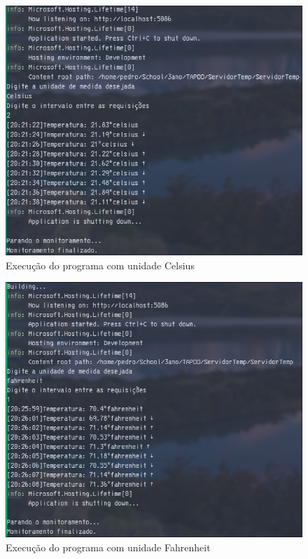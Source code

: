 \documentclass[
	12pt,				%
	oneside,			%
	a4paper,			%
	english,			%
	brazil,				%
	]{abntex2}
\begin{document}
{\begin{figure}[H]
    \centering
    \includegraphics[width=1\textwidth]{imgs/img1.png}
    \caption{Execução do programa com unidade Celsius}
    \label{fig:img1}
\end{figure}

\begin{figure}[H]
    \centering
    \includegraphics[width=1\textwidth]{imgs/img2.png}
    \caption{Execução do programa com unidade Fahrenheit}
    \label{fig:img2}
\end{figure}

}
\end{document}
